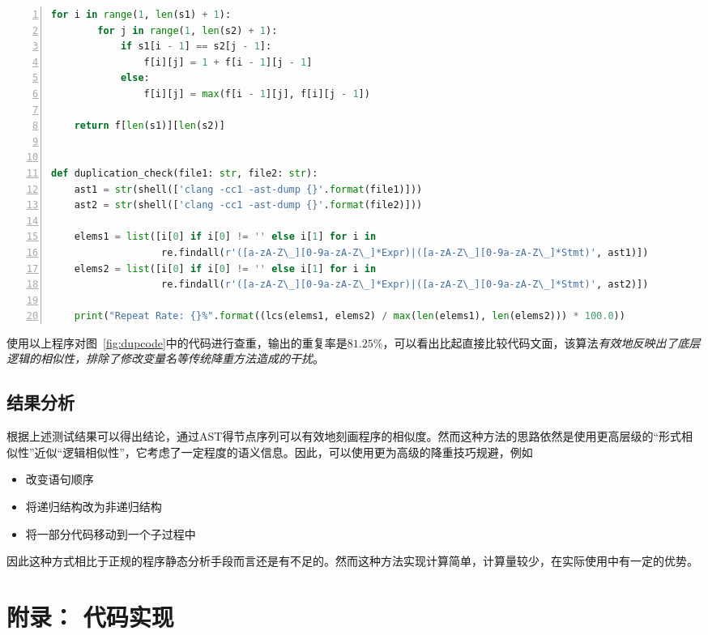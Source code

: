 \documentclass[a4paper,twoside]{article}
\begin{document}
\begin{spacing}{1.2}
\begin{lstlisting}[language=Python,numbers=left,style=PythonStyle,caption=核心部分代码,label={code:dupcheck}]
    for i in range(1, len(s1) + 1):
        for j in range(1, len(s2) + 1):
            if s1[i - 1] == s2[j - 1]:
                f[i][j] = 1 + f[i - 1][j - 1]
            else:
                f[i][j] = max(f[i - 1][j], f[i][j - 1])

    return f[len(s1)][len(s2)]


def duplication_check(file1: str, file2: str):
    ast1 = str(shell(['clang -cc1 -ast-dump {}'.format(file1)]))
    ast2 = str(shell(['clang -cc1 -ast-dump {}'.format(file2)]))

    elems1 = list([i[0] if i[0] != '' else i[1] for i in
                   re.findall(r'([a-zA-Z\_][0-9a-zA-Z\_]*Expr)|([a-zA-Z\_][0-9a-zA-Z\_]*Stmt)', ast1)])
    elems2 = list([i[0] if i[0] != '' else i[1] for i in
                   re.findall(r'([a-zA-Z\_][0-9a-zA-Z\_]*Expr)|([a-zA-Z\_][0-9a-zA-Z\_]*Stmt)', ast2)])

    print("Repeat Rate: {}%".format((lcs(elems1, elems2) / max(len(elems1), len(elems2))) * 100.0))
\end{lstlisting}

使用以上程序对图~\ref{fig:dupcode}中的代码进行查重，输出的重复率是$81.25\%$，可以看出比起直接比较代码文面，该算法\emph{有效地反映出了底层逻辑的相似性，排除了修改变量名等传统降重方法造成的干扰}。

\subsection{结果分析}
根据上述测试结果可以得出结论，通过AST得节点序列可以有效地刻画程序的相似度。然而这种方法的思路依然是使用更高层级的“形式相似性”近似“逻辑相似性”，它考虑了一定程度的语义信息。因此，可以使用更为高级的降重技巧规避，例如

\begin{itemize}
	\item 改变语句顺序
	\item 将递归结构改为非递归结构
	\item 将一部分代码移动到一个子过程中
\end{itemize}

因此这种方式相比于正规的程序静态分析手段而言还是有不足的。然而这种方法实现计算简单，计算量较少，在实际使用中有一定的优势。


\clearpage
\appendix

\section{附录： 代码实现}
\label{sec:app_impl}


\end{spacing}
\end{document}
